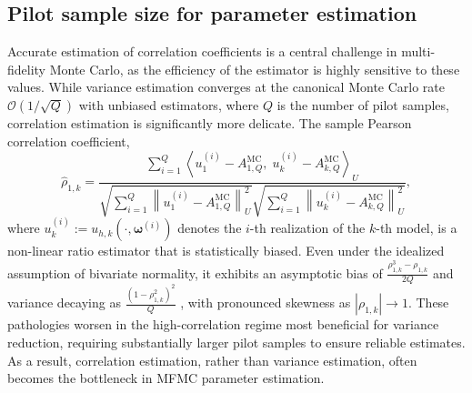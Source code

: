
\subsection{Pilot sample size for parameter estimation}\label{sec:Parameter_Estimation}


\cite{AMaurais_TAlsup_BPeherstorfer_YMMarzouk_2005a}

Accurate estimation of correlation coefficients is a central challenge in multi-fidelity Monte Carlo, as the efficiency of the estimator is highly sensitive to these values. While variance estimation converges at the canonical Monte Carlo rate $\mathcal{O}(1/\sqrt{Q})$ with unbiased estimators, where $Q$ is the number of pilot samples, correlation estimation is significantly more delicate. The sample Pearson correlation coefficient,
%
\[
\widehat{\rho}_{1,k} = \frac{\sum_{i=1}^Q\left\langle u_{1}^{(i)} - A_{1,Q}^{\text{MC}},\; u_{k}^{(i)} - A_{k,Q}^{\text{MC}} \right\rangle_U}{\sqrt{\sum_{i=1}^Q \left\|u_{1}^{(i)} - A_{1,Q}^{\text{MC}}\right\|_U^2} \sqrt{\sum_{i=1}^Q \left\|u_{k}^{(i)} - A_{k,Q}^{\text{MC}}\right\|_U^2}},
\]
%
where $u_k^{(i)} := u_{h,k}(\cdot, \boldsymbol{\omega}^{(i)})$ denotes the $i$-th realization of the $k$-th model, is a non-linear ratio estimator that is statistically biased. Even under the idealized assumption of bivariate normality, it exhibits an asymptotic bias of $\frac{\rho_{1,k}^3 - \rho_{1,k}}{2Q}$ and variance decaying as $\frac{(1 - \rho_{1,k}^2)^2}{Q}$ \cite{Fi:1915, Ha:2007, Ri:1932}, with pronounced skewness as $|\rho_{1,k}| \to 1$. These pathologies worsen in the high-correlation regime most beneficial for variance reduction, requiring substantially larger pilot samples to ensure reliable estimates. As a result, correlation estimation, rather than variance estimation, often becomes the bottleneck in MFMC parameter estimation.




